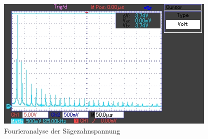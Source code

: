 	\begin{figure}[h]
		\begin{center}
		\includegraphics[scale=1.0]{picfas.jpg}
		\caption{Fourieranalyse der Sägezahnspannung}
		\label{picfas}
		\end{center}	
	\end{figure}